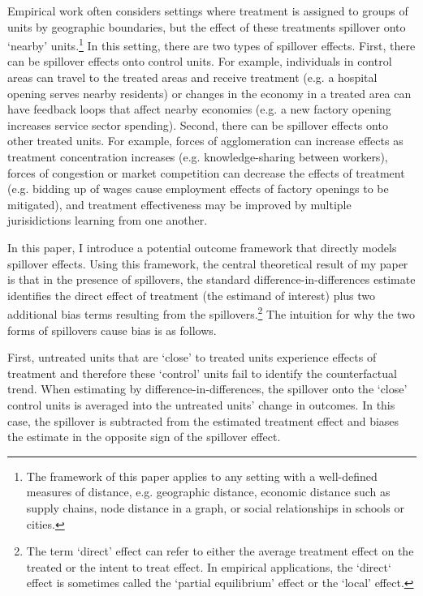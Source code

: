 \documentclass[11pt]{article}
\begin{document}
Empirical work often considers settings where treatment is assigned to groups of units by geographic boundaries, but the effect of these treatments spillover onto `nearby' units.\footnote{The framework of this paper applies to any setting with a well-defined measures of distance, e.g. geographic distance, economic distance such as supply chains, node distance in a graph, or social relationships in schools or cities.} In this setting, there are two types of spillover effects. First, there can be spillover effects onto control units. For example, individuals in control areas can travel to the treated areas and receive treatment (e.g. a hospital opening serves nearby residents) or changes in the economy in a treated area can have feedback loops that affect nearby economies (e.g. a new factory opening increases service sector spending). Second, there can be spillover effects onto other treated units. For example, forces of agglomeration can increase effects as treatment concentration increases (e.g. knowledge-sharing between workers), forces of congestion or market competition can decrease the effects of treatment (e.g. bidding up of wages cause employment effects of factory openings to be mitigated), and treatment effectiveness may be improved by multiple jurisidictions learning from one another. 

In this paper, I introduce a potential outcome framework that directly models spillover effects. Using this framework, the central theoretical result of my paper is that in the presence of spillovers, the standard difference-in-differences estimate identifies the direct effect of treatment (the estimand of interest) plus two additional bias terms resulting from the spillovers.\footnote{The term `direct' effect can refer to either the average treatment effect on the treated or the intent to treat effect. In empirical applications, the `direct` effect is sometimes called the `partial equilibrium' effect or the `local' effect.} The intuition for why the two forms of spillovers cause bias is as follows. 

First, untreated units that are `close' to treated units experience effects of treatment and therefore these `control' units fail to identify the counterfactual trend. When estimating by difference-in-differences, the spillover onto the `close' control units is averaged into the untreated units' change in outcomes. In this case, the spillover is subtracted from the estimated treatment effect and biases the estimate in the opposite sign of the spillover effect. 
\end{document}
